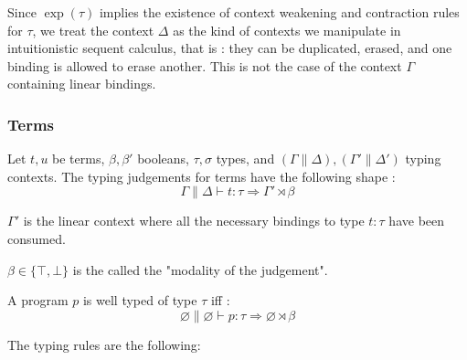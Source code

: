 \documentclass{article}
\begin{document}
Since $\operatorname{exp}(\tau)$ implies the existence of context weakening and contraction rules for $\tau$, we treat the context $\Delta$ as the kind of contexts we manipulate in intuitionistic sequent calculus, that is : they can be duplicated, erased, and one binding is allowed to erase another. This is not the case of the context $\Gamma$ containing linear bindings.

\subsubsection{Terms}

Let $t, u$ be terms, $\beta, \beta'$ booleans, $\tau, \sigma$ types, and $(\Gamma \parallel \Delta), (\Gamma' \parallel \Delta')$ typing contexts. The typing judgements for terms have the following shape :
$$
\Gamma \parallel \Delta \vdash t : \tau \Rightarrow \Gamma' \rtimes \beta
$$

$\Gamma'$ is the linear context where all the necessary bindings to type $t : \tau$ have been consumed. 

$\beta \in \{\top, \bot\}$ is the called the "modality of the judgement". \vspace{\baselineskip}

A program $p$ is well typed of type $\tau$ iff : 
$$
\varnothing \parallel \varnothing \vdash p : \tau \Rightarrow \varnothing \rtimes \beta
$$

The typing rules are the following:
\end{document}
